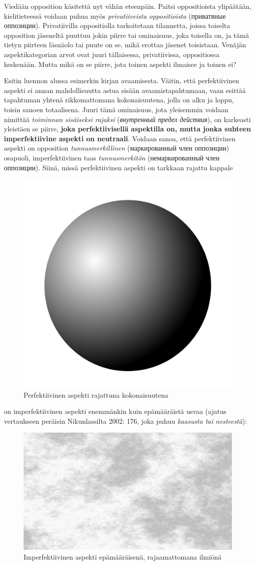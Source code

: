 \documentclass[]{scrartcl}
\begin{document}
Viedään opposition käsitettä nyt vähän eteenpäin. Paitsi oppositioista
ylipäätään, kielitieteessä voidaan puhua myös \emph{privatiiveista
oppositioista} (приватвные оппозиции). Privatiivilla oppositiolla
tarkoitetaan tilannetta, joissa toiselta opposition jäseneltä puuttuu
jokin piirre tai ominaisuus, joka toisella on, ja tämä tietyn piirteen
läsnäolo tai puute on se, mikä erottaa jäsenet toisistaan. Venäjän
aspektikategorian arvot ovat juuri tällaisessa, privatiivissa,
oppositiossa keskenään. Mutta mikä on se piirre, jota toinen aspekti
ilmaisee ja toinen ei?

Esitin luennon alussa esimerkin kirjan avaamisesta. Väitin, että
perfektiivinen aspekti ei annan mahdollisuutta astua sisään
avaamistapahtumaan, vaan esittää tapahtuman yhtenä rikkomattomana
kokonaisuutena, jolla on alku ja loppu, toisin sanoen totaalisena. Juuri
tämä ominaisuus, jota yleisemmin voidaan nimittää \emph{toiminnan
sisäiseksi rajaksi} (\emph{внутренный предел действия}), on karkeasti
yleistäen se piirre, \textbf{joka perfektiivisellä aspektilla on, mutta
jonka suhteen imperfektiivine aspekti on neutraali}. Voidaan sanoa, että
perfektiivinen aspekti on opposition \emph{tunnusmerkillinen}
(маркированный член оппозиции) osapuoli, imperfektiivinen taas
\emph{tunnusmerkitön} (немаркированный член оппозиции). Siinä, missä
perfektiivinen aspekti on tarkkaan rajattu kappale

\FloatBarrier
\begin{figure}[htbp]
\centering
\includegraphics[width=.3\textwidth]{../figure/sphere.png}
\caption{Perfektiivinen aspekti rajattuna kokonaisuutena}
\end{figure}
\FloatBarrier

on imperfektiivinen aspekti enemmänkin kuin epämääräistä usvaa (ajatus
vertaukseen peräisin Nikunlassilta 2002: 176, joka puhuu \emph{kaasusta
tai nesteestä}):

\FloatBarrier
\begin{figure}[htbp]
\centering
\includegraphics[width=.6\textwidth]{../figure/silver-gray-mist-background.jpg}
\caption{Imperfektiivinen aspekti epämääräisenä, rajaamattomana ilmiönä}
\end{figure}
\FloatBarrier
\end{document}
